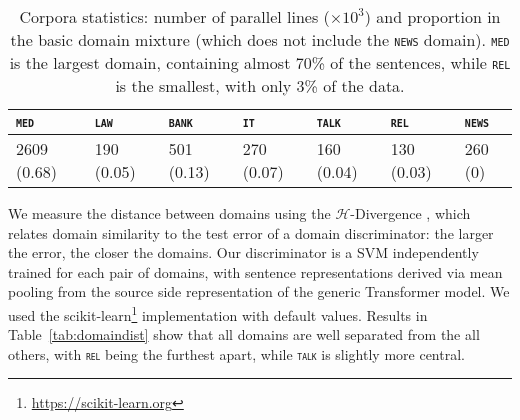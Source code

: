\documentclass[11pt,a4paper]{article}
\newcommand{\fyDone}[1]{\done[FY]\Todo[FY:]{\textcolor{orange}{#1}}}
\newcommand{\domain}[1]{\texttt{\textsc{#1}}}
\begin{document}

\begin{table*}[htbp]
  \centering
  \begin{tabular}{ |lllllll|} %
    \hline
    \domain{med} & \domain{law} & \domain{bank} & \domain{it} & \domain{talk} & \domain{rel} & \domain{news} \\
    \hline
    2609 (0.68) & 190 (0.05)  & 501 (0.13) & 270 (0.07) & 160 (0.04) & 130 (0.03) & 260 (0) \\
    \hline
  \end{tabular}
\caption{Corpora statistics: number of parallel lines ($\times 10^3$) and proportion in the basic domain mixture (which does not include the \domain{news} domain). \domain{med} is the largest domain, containing almost 70\% of the sentences, while \domain{rel} is the smallest, with only 3\% of the data.}
\label{tab:Corpora}
\end{table*}

We measure the distance between domains using the $\mathcal{H}$-Divergence \cite{Ben-David09atheory}, which relates domain similarity to the test error of a domain discriminator: the larger the error, the closer the domains.
Our discriminator is a SVM independently trained for each pair of domains, with sentence representations derived via mean pooling from the source side representation of the generic Transformer model. We used the scikit-learn\footnote{\url{https://scikit-learn.org}} implementation with default values.\fyDone{Inform the classifier details}\fyDone{Insert tableau} Results in Table~\ref{tab:domaindist} show that all domains are well separated from the all others, with \domain{rel} being the furthest apart, while \domain{talk} is slightly more central.
\end{document}
